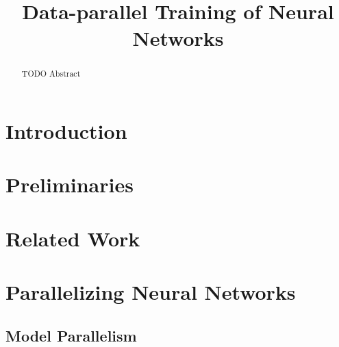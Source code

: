 \documentclass[conference,compsoc,a4paper]{IEEEtran}
\begin{document}
\title{Data-parallel Training of Neural Networks}


\author{
}


\maketitle

\begin{abstract}
TODO Abstract
\end{abstract}

\section{Introduction} %
\label{sec:introduction}


\section{Preliminaries} %
\label{sec:preliminaries}



\section{Related Work} %
\label{sec:related_work}


\section{Parallelizing Neural Networks} %
\label{sec:parallelizing_neural_networks}

\subsection{Model Parallelism} %
\label{sub:model_parallelism}
\end{document}
